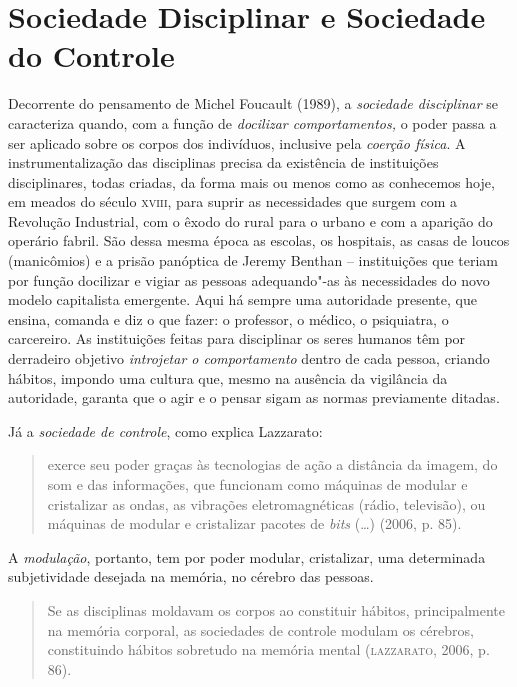 \section{Sociedade Disciplinar e Sociedade do Controle}

\noindent{}Decorrente do pensamento de Michel Foucault (1989), a \emph{sociedade
disciplinar} se caracteriza quando, com a função de \emph{docilizar
comportamentos,} o poder passa a ser aplicado sobre os corpos dos
indivíduos, inclusive pela \emph{coerção física}. A instrumentalização
das disciplinas precisa da existência de instituições disciplinares,
todas criadas, da forma mais ou menos como as conhecemos hoje, em meados
do século \textsc{xviii}, para suprir as necessidades que surgem com a Revolução
Industrial, com o êxodo do rural para o urbano e com a aparição do
operário fabril. São dessa mesma época as escolas, os hospitais, as
casas de loucos (manicômios) e a prisão panóptica de Jeremy Benthan --
instituições que teriam por função docilizar e vigiar as pessoas
adequando"-as às necessidades do novo modelo capitalista emergente. Aqui
há sempre uma autoridade presente, que ensina, comanda e diz o que
fazer: o professor, o médico, o psiquiatra, o carcereiro. As
instituições feitas para disciplinar os seres humanos têm por derradeiro
objetivo \emph{introjetar o comportamento} dentro de cada pessoa,
criando hábitos, impondo uma cultura que, mesmo na ausência da
vigilância da autoridade, garanta que o agir e o pensar sigam as normas
previamente ditadas.

Já a \emph{sociedade de controle}, como explica Lazzarato:

\begin{quote}
exerce seu poder graças às tecnologias de ação a distância da imagem, do
som e das informações, que funcionam como máquinas de modular e
cristalizar as ondas, as vibrações eletromagnéticas (rádio, televisão),
ou máquinas de modular e cristalizar pacotes de \emph{bits} (\ldots{}) (2006, p. 85).
\end{quote}

A \emph{modulação}, portanto, tem por poder modular, cristalizar, uma
determinada subjetividade desejada na memória, no cérebro das pessoas.

\begin{quote}
Se as disciplinas moldavam os corpos ao constituir hábitos,
principalmente na memória corporal, as sociedades de controle modulam os
cérebros, constituindo hábitos sobretudo na memória mental
(\textsc{lazzarato}, 2006, p. 86).
\end{quote}

